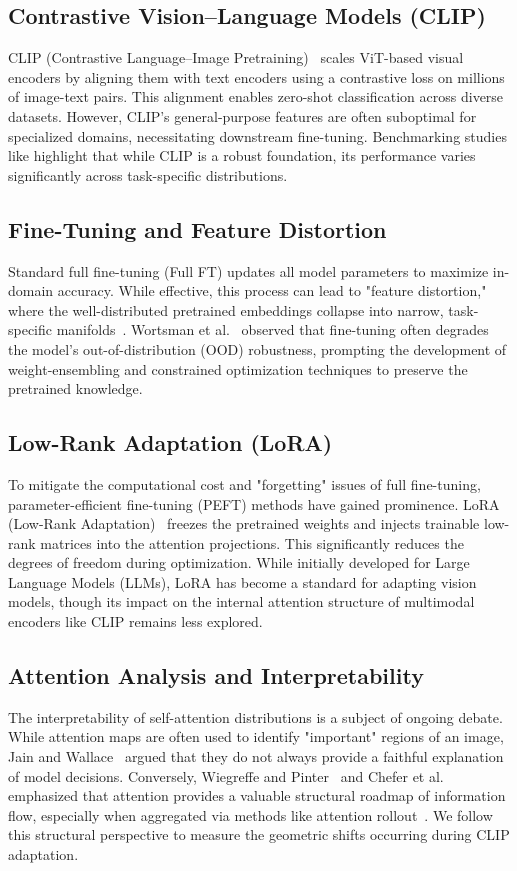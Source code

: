 \documentclass[ai,article,submit,pdftex,oneauthor]{Definitions/mdpi}
\begin{document}
\subsection{Contrastive Vision--Language Models (CLIP)}
CLIP (Contrastive Language--Image Pretraining)~\cite{radford2021learning} scales ViT-based visual encoders by aligning them with text encoders using a contrastive loss on millions of image-text pairs. This alignment enables zero-shot classification across diverse datasets. However, CLIP's general-purpose features are often suboptimal for specialized domains, necessitating downstream fine-tuning. Benchmarking studies like \cite{shao2023vlm} highlight that while CLIP is a robust foundation, its performance varies significantly across task-specific distributions.

\subsection{Fine-Tuning and Feature Distortion}
Standard full fine-tuning (Full FT) updates all model parameters to maximize in-domain accuracy. While effective, this process can lead to "feature distortion," where the well-distributed pretrained embeddings collapse into narrow, task-specific manifolds~\cite{kumar2022finetuning}. Wortsman et al.~\cite{wortsman2022robust} observed that fine-tuning often degrades the model's out-of-distribution (OOD) robustness, prompting the development of weight-ensembling and constrained optimization techniques to preserve the pretrained knowledge.

\subsection{Low-Rank Adaptation (LoRA)}
To mitigate the computational cost and "forgetting" issues of full fine-tuning, parameter-efficient fine-tuning (PEFT) methods have gained prominence. LoRA (Low-Rank Adaptation)~\cite{hu2022lora} freezes the pretrained weights and injects trainable low-rank matrices into the attention projections. This significantly reduces the degrees of freedom during optimization. While initially developed for Large Language Models (LLMs), LoRA has become a standard for adapting vision models, though its impact on the internal attention structure of multimodal encoders like CLIP remains less explored.

\subsection{Attention Analysis and Interpretability}
The interpretability of self-attention distributions is a subject of ongoing debate. While attention maps are often used to identify "important" regions of an image, Jain and Wallace~\cite{jain2019attention} argued that they do not always provide a faithful explanation of model decisions. Conversely, Wiegreffe and Pinter~\cite{wiegreffe2019attention} and Chefer et al.~\cite{chefer2021transformer} emphasized that attention provides a valuable structural roadmap of information flow, especially when aggregated via methods like attention rollout~\cite{abnar2020quantifying}. We follow this structural perspective to measure the geometric shifts occurring during CLIP adaptation.
\end{document}
